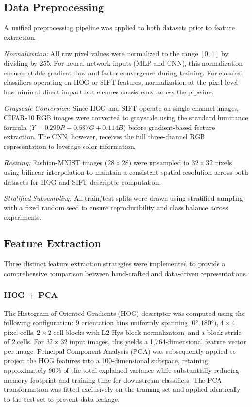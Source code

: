 \documentclass[conference]{IEEEtran}
\begin{document}
\subsection{Data Preprocessing}

A unified preprocessing pipeline was applied to both datasets prior to feature extraction.

\textit{Normalization:} All raw pixel values were normalized to the range $[0, 1]$ by dividing by 255. For neural network inputs (MLP and CNN), this normalization ensures stable gradient flow and faster convergence during training. For classical classifiers operating on HOG or SIFT features, normalization at the pixel level has minimal direct impact but ensures consistency across the pipeline.

\textit{Grayscale Conversion:} Since HOG and SIFT operate on single-channel images, CIFAR-10 RGB images were converted to grayscale using the standard luminance formula ($Y = 0.299R + 0.587G + 0.114B$) before gradient-based feature extraction. The CNN, however, receives the full three-channel RGB representation to leverage color information.

\textit{Resizing:} Fashion-MNIST images ($28\times28$) were upsampled to $32\times32$ pixels using bilinear interpolation to maintain a consistent spatial resolution across both datasets for HOG and SIFT descriptor computation.

\textit{Stratified Subsampling:} All train/test splits were drawn using stratified sampling with a fixed random seed to ensure reproducibility and class balance across experiments.

\subsection{Feature Extraction}

Three distinct feature extraction strategies were implemented to provide a comprehensive comparison between hand-crafted and data-driven representations.

\subsubsection{HOG + PCA}
The Histogram of Oriented Gradients (HOG) descriptor \cite{dalal2005histograms} was computed using the following configuration: 9 orientation bins uniformly spanning $[0°, 180°)$, $4\times4$ pixel cells, $2\times2$ cell blocks with L2-Hys block normalization, and a block stride of 2 cells. For $32\times32$ input images, this yields a 1,764-dimensional feature vector per image. Principal Component Analysis (PCA) was subsequently applied to project the HOG features into a 100-dimensional subspace, retaining approximately 90\% of the total explained variance while substantially reducing memory footprint and training time for downstream classifiers. The PCA transformation was fitted exclusively on the training set and applied identically to the test set to prevent data leakage.
\end{document}
